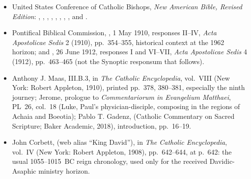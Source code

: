 {\begin{itemize}[leftmargin=1.1em,labelsep=0.35em,itemsep=0em,topsep=0.15em,parsep=0pt]
\item United States Conference of Catholic Bishops, \emph{New American Bible,
Revised Edition}: ,
,
,
,
,
,
,
, and
.

\item Pontifical Biblical Commission,
, 1 May 1910,
responses II--IV, \emph{Acta Apostolicae Sedis} 2 (1910), pp.~354--355,
historical context at the 1962 horizon; and
, 26 June 1912,
responses I and VI--VII, \emph{Acta Apostolicae Sedis} 4 (1912),
pp.~463--465 (not the Synoptic responsum that follows).

\item Anthony J. Maas,
III.B.3, in \emph{The Catholic Encyclopedia}, vol.~VIII (New York: Robert
Appleton, 1910), printed pp.~378, 380--381, especially the ninth journey;
Jerome, prologue to \emph{Commentariorum in Evangelium Matthaei},
PL~26, col.~18 (Luke, Paul's physician-disciple, composing in the regions of
Achaia and Boeotia);
Pablo T. Gadenz,
(Catholic Commentary on Sacred Scripture; Baker Academic, 2018), introduction,
pp.~16--19.

\item John Corbett,
(web alias ``King David''),
in \emph{The Catholic Encyclopedia}, vol.~IV (New York: Robert Appleton,
1908), pp.~642--644, at p.~642: the usual 1055--1015~BC reign chronology,
used only for the received Davidic-Asaphic ministry horizon.


\end{itemize}}
